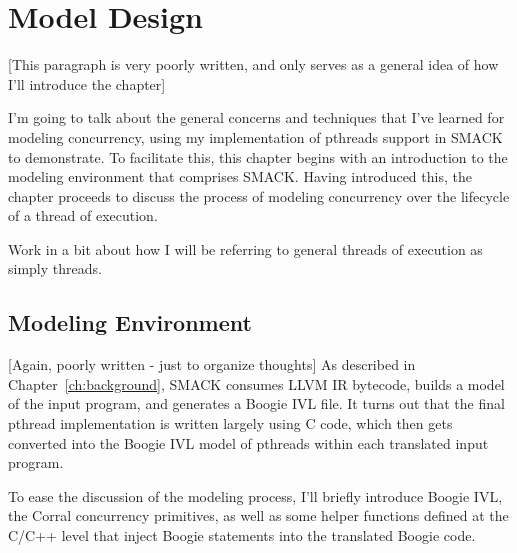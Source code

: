 \chapter{Model Design}\label{ch:modeldesign}
[This paragraph is very poorly written, and only serves as a general
idea of how I'll introduce the chapter]

I'm going to talk about the general concerns and techniques that I've
learned for modeling concurrency, using my implementation of pthreads
support in SMACK to demonstrate.  To facilitate this, this chapter
begins with an introduction to the modeling environment that comprises
SMACK.  Having introduced this, the chapter proceeds to discuss the
process of modeling concurrency over the lifecycle of a thread of
execution.

Work in a bit about how I will be referring to general threads of
execution as simply threads. 

\section{Modeling Environment}
[Again, poorly written - just to organize thoughts]
As described in Chapter~\ref{ch:background}, SMACK consumes LLVM IR
bytecode, builds a model of the input program, and generates a Boogie
IVL file.  It turns out that the final pthread implementation is
written largely using C code, which then gets converted into the
Boogie IVL model of pthreads within each translated input program.

To ease the discussion of the modeling process, I'll briefly introduce
Boogie IVL, the Corral concurrency primitives, as well as some helper
functions defined at the C/C++ level that inject Boogie statements
into the translated Boogie code.

